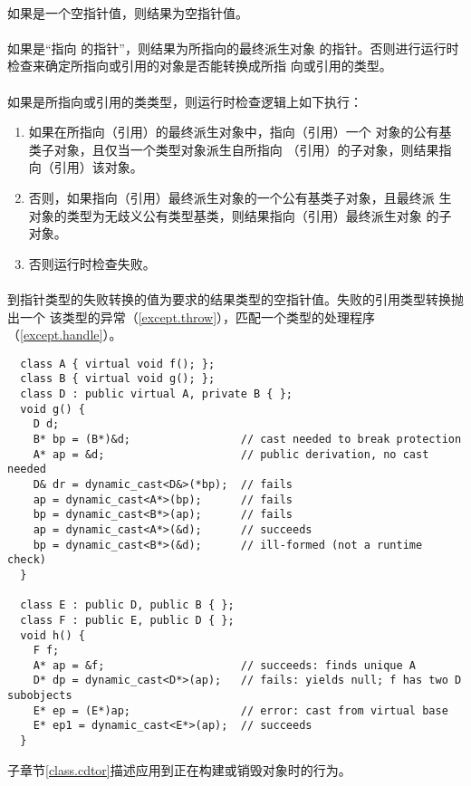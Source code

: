 \paragraph{} %
如果是一个空指针值，则结果为空指针值。

\paragraph{} %
如果是``指向 的指针''，则结果为所指向的最终派生对象
的指针。否则进行运行时检查来确定所指向或引用的对象是否能转换成所指
向或引用的类型。

\paragraph{} %
如果是所指向或引用的类类型，则运行时检查逻辑上如下执行：
\begin{enumerate}
  \item 如果在所指向（引用）的最终派生对象中，指向（引用）一个
        对象的公有基类子对象，且仅当一个类型对象派生自所指向
        （引用）的子对象，则结果指向（引用）该对象。
  \item 否则，如果指向（引用）最终派生对象的一个公有基类子对象，且最终派
        生对象的类型为无歧义公有类型基类，则结果指向（引用）最终派生对象
        的子对象。
  \item 否则运行时检查失败。
\end{enumerate}

\paragraph{} %
到指针类型的失败转换的值为要求的结果类型的空指针值。失败的引用类型转换抛出一个
该类型的异常（\ref{except.throw}），匹配一个类型的处理程序
（\ref{except.handle}）。

\begin{example}
  \begin{lstlisting}
  class A { virtual void f(); };
  class B { virtual void g(); };
  class D : public virtual A, private B { };
  void g() {
    D d;
    B* bp = (B*)&d;                 // cast needed to break protection
    A* ap = &d;                     // public derivation, no cast needed
    D& dr = dynamic_cast<D&>(*bp);  // fails
    ap = dynamic_cast<A*>(bp);      // fails
    bp = dynamic_cast<B*>(ap);      // fails
    ap = dynamic_cast<A*>(&d);      // succeeds
    bp = dynamic_cast<B*>(&d);      // ill-formed (not a runtime check)
  }

  class E : public D, public B { };
  class F : public E, public D { };
  void h() {
    F f;
    A* ap = &f;                     // succeeds: finds unique A
    D* dp = dynamic_cast<D*>(ap);   // fails: yields null; f has two D subobjects
    E* ep = (E*)ap;                 // error: cast from virtual base
    E* ep1 = dynamic_cast<E*>(ap);  // succeeds
  }
  \end{lstlisting}
\end{example}

\begin{note}
  子章节\ref{class.cdtor}描述应用到正在构建或销毁对象时的行为。
\end{note}
